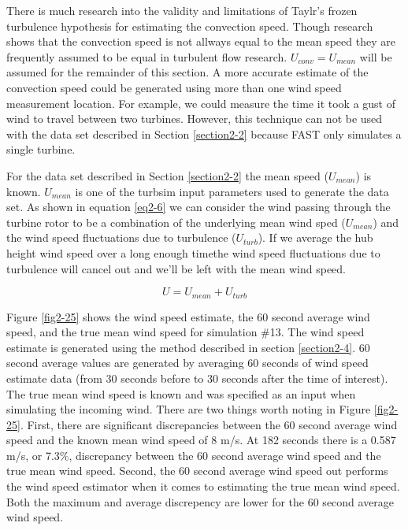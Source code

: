 There is much research into the validity and limitations of Taylr's frozen turbulence hypothesis for estimating the convection speed. \cite{dennis2008,goldschmidt1981,delalamo2009,atkinson2015} Though research shows that the convection speed is not allways equal to the mean speed they are frequently assumed to be equal in turbulent flow research. $U_{conv} = U_{mean}$ will be assumed for the remainder of this section. A more accurate estimate of the convection speed could be generated using more than one wind speed measurement location. For example, we could measure the time it took a gust of wind to travel between two turbines. However, this technique can not be used with the data set described in Section \ref{section2-2} because FAST only simulates a single turbine.

For the data set described in Section \ref{section2-2} the mean speed ($U_{mean}$) is known. $U_{mean}$ is one of the turbsim input parameters used to generate the data set. As shown in equation \ref{eq2-6} we can consider the wind passing through the turbine rotor to be a combination of the underlying mean wind sped ($U_{mean}$) and the wind speed fluctuations due to turbulence ($U_{turb}$). If we average the hub height wind speed over a long enough timethe wind speed fluctuations due to turbulence will cancel out and we'll be left with the mean wind speed. 


\begin{equation}
	 U =  U_{mean} +U_{turb}  \label{eq2-6}
\end{equation}

Figure \ref{fig2-25} shows the wind speed estimate, the 60 second average wind speed, and the true mean wind speed for simulation \#13. The wind speed estimate is generated using the method described in section \ref{section2-4}. 60 second average values are generated by averaging 60 seconds of wind speed estimate data (from 30 seconds before to 30 seconds after the time of interest). The true mean wind speed is known and was specified as an input when simulating the incoming wind. There are two things worth noting in Figure \ref{fig2-25}. First, there are significant discrepancies between the 60 second average wind speed and the known mean wind speed of 8 m/s. At 182 seconds there is a 0.587 m/s, or 7.3\%,  discrepancy between the 60 second average wind speed and the true mean wind speed. Second, the 60 second average wind speed out performs the wind speed estimator when it comes to estimating the true mean wind speed. Both the maximum and average discrepency are lower for the 60 second average wind speed. 

